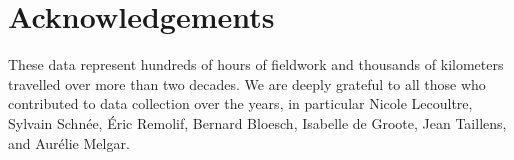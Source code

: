 \section*{Acknowledgements}

These data represent hundreds of hours of fieldwork and thousands of kilometers travelled over more than two decades. We are deeply grateful to all those who contributed to data collection over the years, in particular Nicole Lecoultre, Sylvain Schnée, Éric Remolif, Bernard Bloesch, Isabelle de Groote, Jean Taillens, and Aurélie Melgar.
